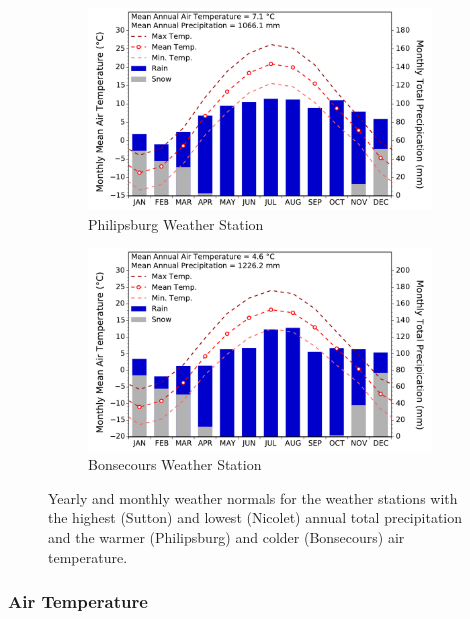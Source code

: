\documentclass[TechnicalNoteMeteo.tex]{subfiles}
\begin{document}
\begin{figure}[bh!]
    \begin{subfigure}{0.45\textwidth}
        \includegraphics[width=\textwidth]{img/weather_normals_philipsburg}
        \caption{Philipsburg Weather Station}
    \end{subfigure} 
    \hspace{0.04\textwidth}   
    \begin{subfigure}{0.45\textwidth}
        \includegraphics[width=\textwidth]{img/weather_normals_bonsecours}
        \caption{Bonsecours Weather Station}
    \end{subfigure}
    \caption{Yearly and monthly weather normals for the weather stations with the highest (Sutton) and lowest (Nicolet) annual total precipitation and the warmer (Philipsburg) and colder (Bonsecours) air temperature.}
    \label{fig:weatherNormals}
\end{figure}



\subsubsection{Air Temperature}
\end{document}
